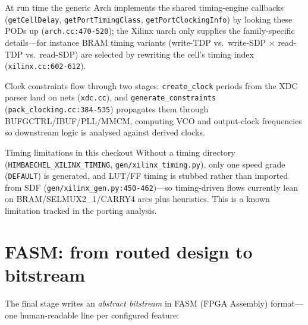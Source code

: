 \documentclass[11pt,a4paper]{article}
\begin{document}
At run time the generic Arch implements the shared timing-engine
callbacks (\texttt{getCellDelay}, \texttt{getPortTimingClass},
\allowbreak\texttt{getPortClockingInfo}) by looking these PODs up
(\texttt{arch.cc:470-520}); the Xilinx uarch only supplies the
family-specific details---for instance BRAM timing variants (write-TDP
vs.\ write-SDP $\times$ read-TDP vs.\ read-SDP) are selected by
rewriting the cell's timing index (\texttt{xilinx.cc:602-612}).

Clock constraints flow through two stages: \texttt{create\_clock}
periods from the XDC parser land on nets (\texttt{xdc.cc}), and
\texttt{generate\_constraints} (\texttt{pack\_clocking.cc:384-535})
propagates them through BUFGCTRL/IBUF/PLL/MMCM, computing VCO and
output-clock frequencies so downstream logic is analysed against
derived clocks.

\begin{warnbox}{Timing limitations in this checkout}
Without a timing directory (\texttt{HIMBAECHEL\_XILINX\_TIMING},
\texttt{gen/xilinx\_timing.py}), only one speed grade (\texttt{DEFAULT}) is
generated, and LUT/FF timing is stubbed rather
than imported from SDF (\texttt{gen/xilinx\_gen.py:450-462})---so
timing-driven flows currently lean on BRAM/SELMUX2\_1/CARRY4 arcs plus
heuristics. This is a known limitation tracked in the porting analysis.
\end{warnbox}

\section{FASM: from routed design to bitstream}

The final stage writes an \emph{abstract bitstream} in FASM (FPGA
Assembly) format---one human-readable line per configured feature:
\end{document}

